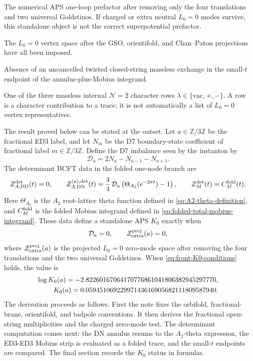 \documentclass[11pt]{article}
\newcommand{\Z}{\mathbb{Z}}
\newcommand{\vac}{\mathrm{vac}}
\newcommand{\DN}{\mathrm{DN}}
\newcommand{\DD}{\mathrm{DD}}
\newcommand{\e}{\mathrm{e}}
\begin{document}
\begin{description}[style=nextline,leftmargin=2.8cm]
The numerical APS one-loop prefactor after removing only the four translations and two universal
Goldstinos. If charged or extra neutral \(L_0=0\) modes survive, this standalone object is not
the correct superpotential prefactor.
\item[projected zero-mode space]
The \(L_0=0\) vertex space after the GSO, orientifold, and Chan--Paton projections have all been
imposed.
\item[twisted tadpole compatibility]
Absence of an uncancelled twisted closed-string massless exchange in the small-\(t\) endpoint of
the annulus-plus-Mobius integrand.
\item[massless row]
One of the three massless internal \(\mathcal N=2\) character rows
\(\lambda\in\{\vac,+,-\}\). A row is a character contribution to a trace; it is not automatically
a list of \(L_0=0\) vertex representatives.
\end{description}

The result proved below can be stated at the outset. Let \(a\in\Z/3\Z\) be the fractional ED3
label, and let \(N_m\) be the D7 boundary-state coefficient of fractional label
\(m\in\Z/3\Z\). Define the D7 imbalance seen by the instanton by
\begin{equation}
  \mathcal D_a=2N_a-N_{a-1}-N_{a+1}.
  \label{eq:front-D7-imbalance}
\end{equation}
The determinant BCFT data in the folded one-node branch are
\begin{equation}
  Z_{A,\DD}^{\det}(t)=0,\qquad
  Z_{A,\DN}^{(a),\det}(t)
  =
  \frac34\,\mathcal D_a\left(\Theta_{A_2}(\e^{-2\pi t})-1\right),
  \qquad
  Z_M^{\det}(t)=C_M^{\rm fold}(t).
  \label{eq:front-determinant-data}
\end{equation}
Here \(\Theta_{A_2}\) is the \(A_2\) root-lattice theta function defined in
\eqref{eq:A2-theta-definition}, and \(C_M^{\rm fold}\) is the folded Mobius integrand defined
in \eqref{eq:folded-total-mobius-integrand}. These data define a standalone APS \(K_0\) exactly
when
\begin{equation}
  \mathcal D_a=0,
  \qquad
  \mathcal Z_{\rm extra}^{\rm proj}(a)=0,
  \label{eq:front-K0-conditions}
\end{equation}
where \(\mathcal Z_{\rm extra}^{\rm proj}(a)\) is the projected \(L_0=0\) zero-mode space after
removing the four translations and the two universal Goldstinos. When
\eqref{eq:front-K0-conditions} holds, the value is
\begin{align}
  \log K_0(a)=-2.82260167064170776861041806382945297770,
  \notag\\
  K_0(a)=0.05945106922997143616905682111809587940.
  \label{eq:front-K0-number}
\end{align}
The derivation proceeds as follows. First the note fixes the orbifold, fractional-brane,
orientifold, and tadpole conventions. It then derives the fractional open-string
multiplicities and the charged zero-mode test. The determinant computation comes next: the DN
annulus resums to the \(A_2\)-theta expression, the ED3-ED3 Mobius strip is evaluated as a
folded trace, and the small-\(t\) endpoints are compared. The final section records the
\(K_0\) status in formulas.
\end{document}
